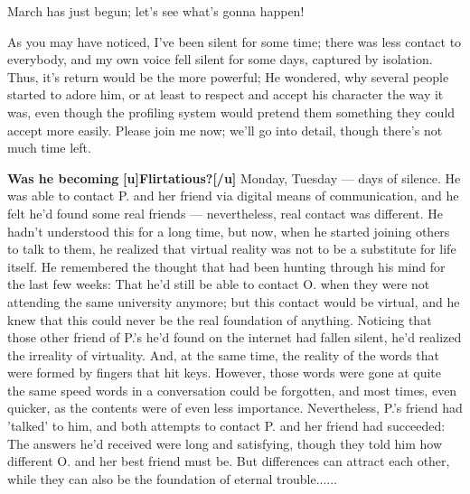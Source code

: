 March has just begun; let's see what's gonna happen!

As you may have noticed, I've been silent for some time; there was less contact to everybody, and my own voice fell silent for some days, captured by isolation. 
Thus, it's return would be the more powerful; He wondered, why several people started to adore him, or at least to respect and accept his character the way it was, even though the profiling system would pretend them something they could accept more easily. 
Please join me now; we'll go into detail, though there's not much time left. 

\textbf{Was he becoming}
\textbf{[u]Flirtatious?[/u]}
Monday, Tuesday --- days of silence. He was able to contact P. and her friend via digital means of communication, and he felt he'd found some real friends --- nevertheless, real contact was different. He hadn't understood this for a long time, but now, when he started joining others to talk to them, he realized that virtual reality was not to be a substitute for life itself. 
He remembered the thought that had been hunting through his mind for the last few weeks: That he'd still be able to contact O. when they were not attending the same university anymore; but this contact would be virtual, and he knew that this could never be the real foundation of anything. Noticing that those other friend of P.'s he'd found on the internet had fallen silent, he'd realized the irreality of virtuality. 
And, at the same time, the reality of the words that were formed by fingers that hit keys. However, those words were gone at quite the same speed words in a conversation could be forgotten, and most times, even quicker, as the contents were of even less importance. 
Nevertheless, P.'s friend had 'talked' to him, and both attempts to contact P. and her friend had succeeded: The answers he'd received were long and satisfying, though they told him how different O. and her best friend must be. But differences can attract each other, while they can also be the foundation of eternal trouble......
